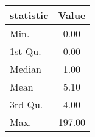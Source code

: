 \begin{tabular}{lc}
  \hline
statistic & Value \\ 
  \hline
Min. & 0.00 \\ 
  1st Qu. & 0.00 \\ 
  Median & 1.00 \\ 
  Mean & 5.10 \\ 
  3rd Qu. & 4.00 \\ 
  Max. & 197.00 \\ 
   \hline
\end{tabular}
